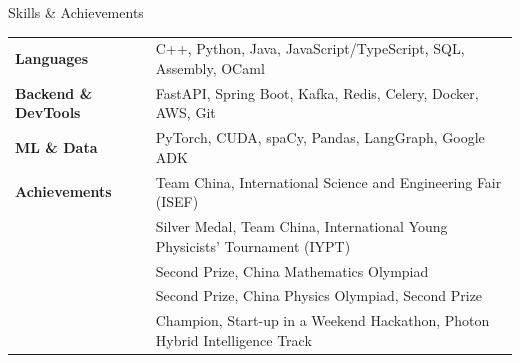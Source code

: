 \documentclass[
	10pt, %
]{resume} %
\begin{document}
\begin{rSection}{Skills \& Achievements}

  	\begin{tabular}{@{} >{\bfseries}l @{\hspace{6ex}} l @{}}
    	Languages & C++, Python, Java, JavaScript/TypeScript, SQL, Assembly, OCaml \\
    	Backend \& DevTools & FastAPI, Spring Boot, Kafka, Redis, Celery, Docker, AWS, Git \\
    	ML \& Data & PyTorch, CUDA, spaCy, Pandas, LangGraph, Google ADK \\
		Achievements & Team China, International Science and Engineering Fair (ISEF)\\
		& Silver Medal, Team China, International Young Physicists' Tournament (IYPT) \\
		& Second Prize, China Mathematics Olympiad\\
		& Second Prize, China Physics Olympiad, Second Prize\\
		& Champion, Start-up in a Weekend Hackathon, Photon Hybrid Intelligence Track

  	\end{tabular}

\end{rSection}

\end{document}
